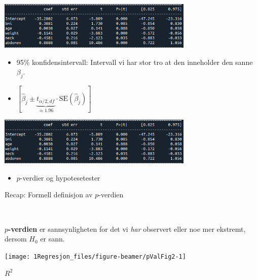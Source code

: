 \documentclass[10pt,ignorenonframetext,]{beamer}
\providecommand{\tightlist}{%
  \setlength{\itemsep}{0pt}\setlength{\parskip}{0pt}}
\begin{document}
\begin{frame}

\includegraphics[width=0.7\textwidth,height=\textheight]{ols_result_all_coefs.png}

\vspace{5mm}

\begin{itemize}
\item
  95\% konfidensintervall: Intervall vi har stor tro at den inneholder
  den sanne \(\beta_j\).
\item
  \([\hat\beta_j \pm \underbrace{t_{\alpha/2,df}}_{\approx 1.96}\cdot \text{SE}(\hat\beta_j)]\)
\end{itemize}

\vspace{20mm}

\end{frame}

\begin{frame}

\includegraphics[width=0.7\textwidth,height=\textheight]{ols_result_all_coefs.png}

\vspace{5mm}

\begin{itemize}
\tightlist
\item
  \(p\)-verdier og hypotesetester
\end{itemize}

\vspace{20mm}

\end{frame}

\begin{frame}

\begin{block}{Recap: Formell definisjon av \(p\)-verdien}

\(~\)

\textbf{\(p\)-verdien} er sannsynligheten for det vi \emph{har}
observert eller noe mer ekstremt, dersom \(H_0\) er sann.

\vspace{3mm}

\begin{center}\texttt{[image: 1Regresjon\_files/figure-beamer/pValFig2-1]} \end{center}

\end{block}

\end{frame}

\begin{frame}

\begin{block}{\(R^2\)}

\end{block}

\end{frame}

\begin{frame}

\end{frame}
\end{document}
